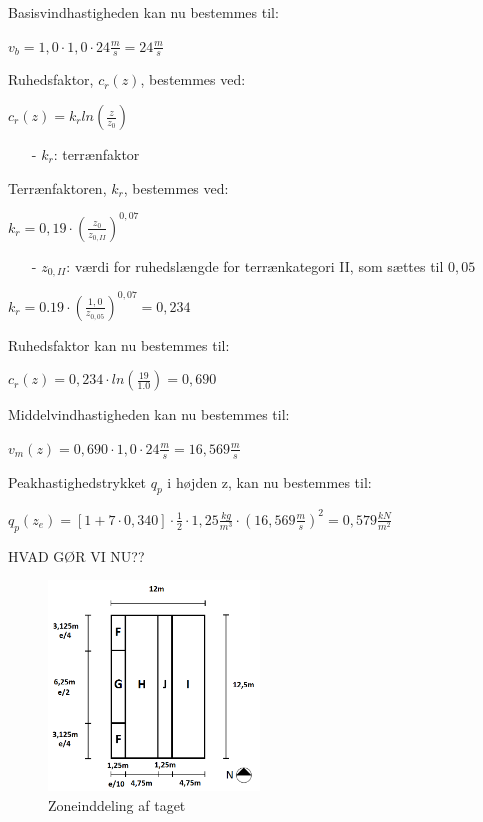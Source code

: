 Basisvindhastigheden kan nu bestemmes til:
\begin{center}
$v_b=1,\!0\cdot 1,\!0\cdot 24 \frac{m}{s}=24 \frac{m}{s}$
\end{center}
Ruhedsfaktor, $c_r(z)$, bestemmes ved:
\begin{center}
$c_r(z)=k_rln(\frac{z}{z_0})$
\end{center}
\begin{itemize}
	\item[-] $k_r$: terrænfaktor
\end{itemize}
Terrænfaktoren, $k_r$, bestemmes ved:
\begin{center}
$k_r=0,\!19\cdot (\frac{z_0}{z_{0,II}})^{0,\!07}$
\end{center}
\begin{itemize}
	\item[-] $z_{0,II}$: værdi for ruhedslængde for terrænkategori II, som sættes til $0,\!05$ \citep[ kapitel 4.3.2]{EU91}
\end{itemize}
\begin{center}
$k_r=0.19\cdot (\frac{1,\!0}{z_{0,\!05}})^{0,\!07}=0,\!234$
\end{center}
Ruhedsfaktor kan nu bestemmes til:
\begin{center}
$c_r(z)=0,\!234\cdot ln(\frac{19}{1.0})=0,\!690$
\end{center}
Middelvindhastigheden kan nu bestemmes til:
\begin{center}
$v_m(z)=0,\!690\cdot 1,\!0\cdot 24 \frac{m}{s}=16,\!569 \frac{m}{s}$
\end{center}
Peakhastighedstrykket $q_p$ i højden z, kan nu bestemmes til:
\begin{center}
$q_p(z_e)=[1+7\cdot 0,\!340]\cdot \frac{1}{2}\cdot 1,\!25 \frac{kg}{m^3}\cdot (16,\!569 \frac{m}{s})^2=0,\!579 \frac{kN}{m^2}$
\end{center}

HVAD GØR VI NU??

\begin{figure}[htbp]
	\centering
	\includegraphics[width=0.5\textwidth]{billeder/opdeling.png}
	\caption{Zoneinddeling af taget}
	\label{fig:tag}
\end{figure}

